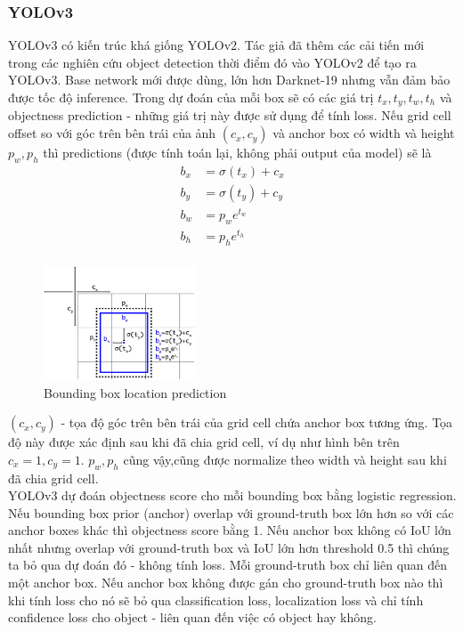 \subsubsection{YOLOv3}
YOLOv3 có kiến trúc khá giống YOLOv2. Tác giả đã thêm các cải tiến mới trong các nghiên cứu object detection thời điểm đó vào YOLOv2 để tạo ra YOLOv3. Base network mới được dùng, lớn hơn Darknet-19 nhưng vẫn đảm bảo được tốc độ inference.
Trong dự đoán của mỗi box sẽ có các giá trị $t_x, t_y, t_w, t_h$ và objectness prediction - những giá trị này được sử dụng để tính loss. Nếu grid cell offset so với góc trên bên trái của ảnh $(c_x, c_y)$ và anchor box có width và height $p_w, p_h$ thì predictions (được tính toán lại, không phải output của model) sẽ là
\begin{equation*}
    \begin{aligned}
b_x &= \sigma(t_x) + c_x\\
b_y &= \sigma(t_y) + c_y\\
b_w &= p_w e^{t_w}\\
b_h &= p_h e^{t_h}\\
\end{aligned}
\end{equation*}
\begin{figure}[htp]
    \centering
    \includegraphics[width=0.4\textwidth]{images/2a-sign/yolov3.jpeg}
    \caption{Bounding box location prediction}
\end{figure}

$(c_x, c_y)$ - tọa độ góc trên bên trái của grid cell chứa anchor box tương ứng. Tọa độ này được xác định sau khi đã chia grid cell, ví dụ như hình bên trên $c_x = 1, c_y = 1$. $p_w, p_h$ cũng vậy,cũng được normalize theo width và height sau khi đã chia grid cell.\\
\newline
YOLOv3 dự đoán objectness score cho mỗi bounding box bằng logistic regression. Nếu bounding box prior (anchor) overlap với ground-truth box lớn hơn so với các anchor boxes khác thì objectness score bằng 1. Nếu anchor box không có IoU lớn nhất nhưng overlap với ground-truth box và IoU lớn hơn threshold 0.5 thì chúng ta bỏ qua dự đoán đó - không tính loss. Mỗi ground-truth box chỉ liên quan đến một anchor box. Nếu anchor box không được gán cho ground-truth box nào thì khi tính loss cho nó sẽ bỏ qua classification loss, localization loss và chỉ tính confidence loss cho object - liên quan đến việc có object hay không.

